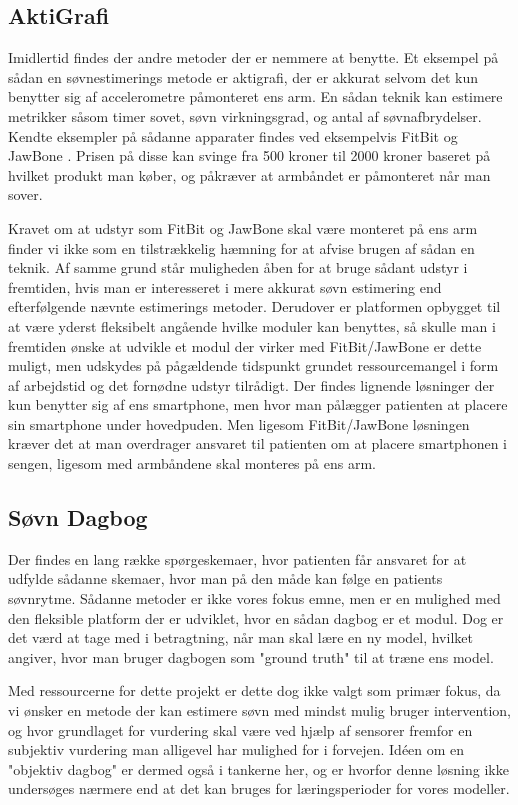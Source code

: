\subsection{AktiGrafi}
Imidlertid findes der andre metoder der er nemmere at benytte.
Et eksempel på sådan en søvnestimerings metode er aktigrafi, der er akkurat selvom det kun benytter sig af accelerometre påmonteret ens arm.
En sådan teknik kan estimere metrikker såsom timer sovet, søvn virkningsgrad, og antal af søvnafbrydelser.
Kendte eksempler på sådanne apparater findes ved eksempelvis FitBit og JawBone \citep{misc:fitbitSleepTracking,misc:jawBoneSleepTracking}.
Prisen på disse kan svinge fra 500 kroner til 2000 kroner baseret på hvilket produkt man køber, og påkræver at armbåndet er påmonteret når man sover.

Kravet om at udstyr som FitBit og JawBone skal være monteret på ens arm finder vi ikke som en tilstrækkelig hæmning for at afvise brugen af sådan en teknik.
Af samme grund står muligheden åben for at bruge sådant udstyr i fremtiden, hvis man er interesseret i mere akkurat søvn estimering end efterfølgende nævnte estimerings metoder.
Derudover er platformen opbygget til at være yderst fleksibelt angående hvilke moduler kan benyttes, så skulle man i fremtiden ønske at udvikle et modul der virker med FitBit/JawBone er dette muligt, men udskydes på pågældende tidspunkt grundet ressourcemangel i form af arbejdstid og det fornødne udstyr tilrådigt.
Der findes lignende løsninger der kun benytter sig af ens smartphone, men hvor man pålægger patienten at placere sin smartphone under hovedpuden.
Men ligesom FitBit/JawBone løsningen kræver det at man overdrager ansvaret til patienten om at placere smartphonen i sengen, ligesom med armbåndene skal monteres på ens arm.

\subsection{Søvn Dagbog}
Der findes en lang række spørgeskemaer, hvor patienten får ansvaret for at udfylde sådanne skemaer, hvor man på den måde kan følge en patients søvnrytme.
Sådanne metoder er ikke vores fokus emne, men er en mulighed med den fleksible platform der er udviklet, hvor en sådan dagbog er et modul.
Dog er det værd at tage med i betragtning, når man skal lære en ny model, hvilket \cite{Min:2014:TNT:2556288.2557220} angiver, hvor man bruger dagbogen som "ground truth" til at træne ens model.

Med ressourcerne for dette projekt er dette dog ikke valgt som primær fokus, da vi ønsker en metode der kan estimere søvn med mindst mulig bruger intervention, og hvor grundlaget for vurdering skal være ved hjælp af sensorer fremfor en subjektiv vurdering man alligevel har mulighed for i forvejen.
Idéen om en "objektiv dagbog" er dermed også i tankerne her, og er hvorfor denne løsning ikke undersøges nærmere end at det kan bruges for læringsperioder for vores modeller.

